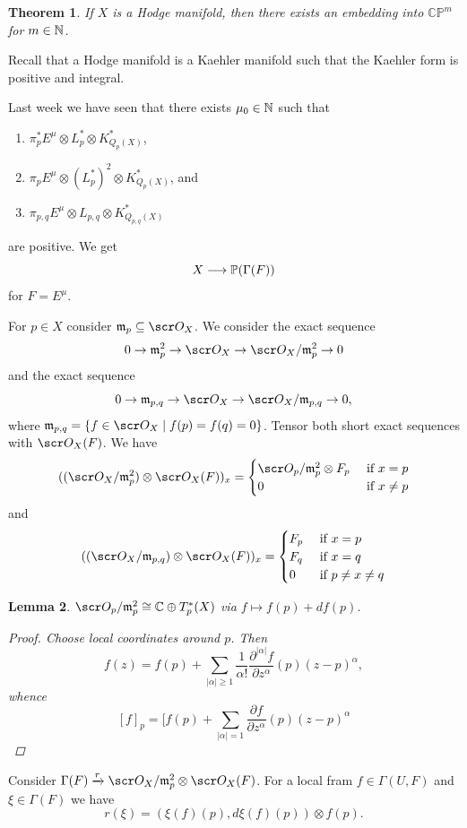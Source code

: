 \documentclass[A4paper, british, reqno]{amsart}
\theoremstyle{darkgreentheorem}
\newtheorem{thm}{Theorem}[section]
\newtheorem{lm}[thm]{Lemma}
\theoremstyle{darkbluedefinition}
\theoremstyle{darkredexample}
\theoremstyle{remark}
\newcommand{\CP}{\mathbb{CP}}
\newcommand{\1}{\mathbbm{1}}
\newcommand{\ot}{\otimes}
\newcommand{\op}{\oplus}
\newcommand{\sub}{\subseteq}
\begin{document}
\begin{thm}
    If $X$ is a Hodge manifold, then there exists an embedding into $\CP^{m}$ for $m\in \N$.
\end{thm}

Recall that a Hodge manifold is a Kaehler manifold such that the Kaehler form is positive and integral.

Last week we have seen that there exists $\mu_{0}\in \N$ such that
\begin{enumerate}[label=\roman*)]
    \item $\pi_{p}^{*}E^{\mu}\ot L_{p}^{*}\ot K_{Q_{p}(X)}^{*}$,
    \item $\pi_{p}E^{\mu}\ot (L_{p}^{*})^{2}\ot K_{Q_{p}(X)}^{*}$, and
    \item $\pi_{p,q}E^{\mu}\ot L_{p,q}\ot K_{Q_{p,q}(X)}^{*}$
\end{enumerate}
are positive.
We get
\[ X\longrightarrow \P(\Gamma(F))\]
for $F=E^{\mu}$.

For $p\in X$ consider $\m_{p}\sub \O_{X}$.
We consider the exact sequence
\[ 0\to \m_{p}^{2}\to \O_{X}\to \O_{X}/\m_{p}^{2}\to 0\]
and the exact sequence
\[ 0\to \m_{p,q}\to \O_{X}\to \O_{X}/\m_{p,q} \to 0, \]
where $\m_{p,q}=\{f\in \O_{X}\mid f(p)=f(q)=0 \}$.
Tensor both short exact sequences with $\O_{X}(F)$.
We have
\[ ((\O_{X}/\m_{p}^{2})\ot \O_{X}(F))_{x}=\begin{cases} \O_{p}/\m_{p}^{2}\ot F_{p} &\text{ if }x=p \\
    0 &\text{ if }x\neq p
\end{cases}\]
and
\[ ((\O_{X}/\m_{p,q})\ot \O_{X}(F))_{x}=\begin{cases} F_{p} &\text{ if } x=p \\
    F_{q} &\text{ if }x=q \\
    0 &\text{ if }p\neq x\neq q
\end{cases} \]

\begin{lm}
    $\O_{p}/\m_{p}^{2}\cong \C\op T_{p}^{*}(X)$ via $f\mapsto f(p)+df(p)$.
    \begin{proof}
	Choose local coordinates around $p$.
	Then
	\[ f(z)=f(p)+\sum_{|\alpha|\geqslant 1}\frac{1}{\alpha !}\frac{\partial^{|\alpha|} f}{\partial z^{\alpha}}(p)(z-p)^{\alpha}, \]
	whence
	\[ [f]_{p}=[f(p)+\sum_{|\alpha|=1}\frac{\partial f}{\partial z^{\alpha}}(p)(z-p)^{\alpha} \]
    \end{proof}
\end{lm}

Consider $\Gamma(F)\xrightarrow{r} \O_{X}/\m_{p}^{2}\ot \O_{X}(F) $.
For a local fram $f\in \Gamma(U,F)$ and $\xi\in \Gamma(F)$ we have
\[ r(\xi)=(\xi(f)(p),d\xi(f)(p))\ot f(p). \]
\end{document}
